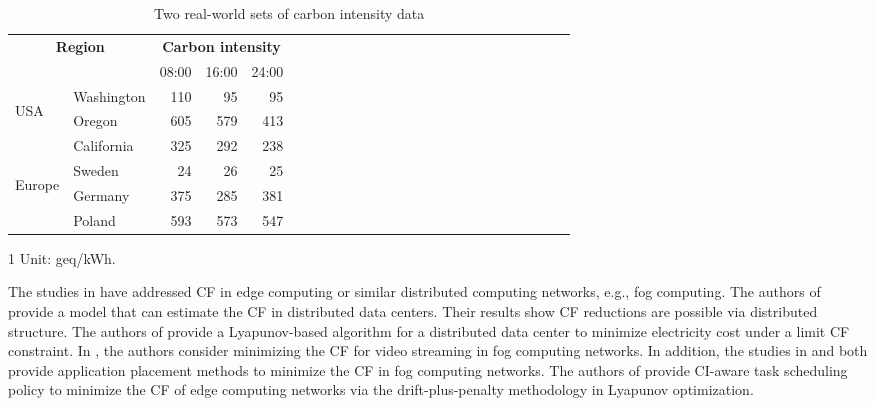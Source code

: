 \documentclass[conference, 10pt, ﬁnal, letterpaper, twocolumn]{IEEEtran}
\begin{document}
\begin{table}[h]
    \caption{\label{tab:data}Two real-world sets of carbon intensity data}
    \begin{center}
        \begin{threeparttable}[b]
            \begin{tabular}{*{5}{llrrr}}
                \toprule
                \midrule
                 \multicolumn{2}{c}{\multirow{2}{*}{\bf Region}} & \multicolumn{3}{c}{\bf Carbon intensity\tnote{1}}\\
                 \cmidrule(lr){3-5}
                \multicolumn{2}{c}{} & 08:00 & 16:00 & 24:00 \\
                \midrule
                 \multirow{3}{*}{\begin{turn}{90} USA \end{turn}} & Washington & 110 & 95  & 95\\
                 & Oregon & 605 & 579 & 413\\
                 & California & 325 & 292  & 238\\
                \midrule
                 \multirow{3}{*}{\begin{turn}{90} Europe \end{turn}} & Sweden & 24 & 26 & 25\\
                 & Germany & 375 & 285 & 381\\
                 & Poland & 593 & 573 & 547\\
                \midrule
                \bottomrule
            \end{tabular}
            
            \begin{tablenotes}
            	\footnotesize
            	\item[1]Unit: geq/kWh.
            \end{tablenotes}
        \end{threeparttable}
    \end{center}
\end{table}



The studies in \cite{van2012distributed, Rad2022Carbon, do2015proximal, aldossary2021towards, yang2022carbon} have addressed CF in edge computing or similar distributed computing networks, e.g., fog computing. The authors of \cite{van2012distributed} provide a model that can estimate the CF in distributed data centers. Their results show CF reductions are possible via distributed structure. The authors of \cite{Rad2022Carbon} provide a Lyapunov-based algorithm for a distributed data center to minimize electricity cost under a limit CF constraint. In \cite{do2015proximal}, the authors consider minimizing the CF for video streaming in fog computing networks. In addition, the studies in \cite{aldossary2021towards} and \cite{ahvar2021deca} both provide application placement methods to minimize the CF in fog computing networks. The authors of \cite{yang2022carbon} provide CI-aware task scheduling policy to minimize the CF of edge computing networks via the drift-plus-penalty methodology in Lyapunov optimization. 
\end{document}
